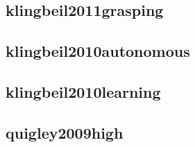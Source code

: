 \subsection{klingbeil2011grasping}



\subsection{klingbeil2010autonomous}



\subsection{klingbeil2010learning}



\subsection{quigley2009high}

